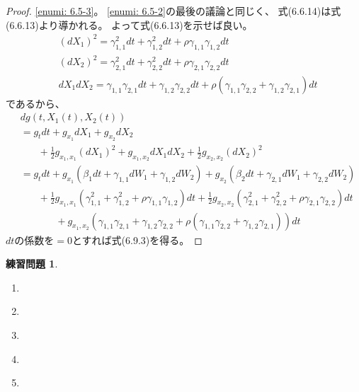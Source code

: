 \documentclass[uplatex]{jsarticle}
\theoremstyle{definition}
\newtheorem{prob}[prob]{練習問題}
\begin{document}
\begin{proof}
  \ref{enumi: 6.5-3}。
  \ref{enumi: 6.5-2}の最後の議論と同じく、
  式(6.6.14)は式(6.6.13)より導かれる。
  よって式(6.6.13)を示せば良い。
  \begin{align*}
    &(dX_1)^2
    = \gamma_{1,1}^2dt + \gamma_{1,2}^2dt
    + \rho \gamma_{1,1}\gamma_{1,2}dt \\
    &(dX_2)^2
    = \gamma_{2,1}^2dt + \gamma_{2,2}^2dt
    + \rho \gamma_{2,1}\gamma_{2,2}dt \\
    &dX_1dX_2
    = \gamma_{1,1}\gamma_{2,1}dt + \gamma_{1,2}\gamma_{2,2}dt
    + \rho (\gamma_{1,1}\gamma_{2,2} + \gamma_{1,2}\gamma_{2,1}) dt
  \end{align*}
  であるから、
  \begin{align*}
    &dg(t,X_1(t),X_2(t)) \\
    &= g_tdt
    + g_{x_1}dX_1 + g_{x_2}dX_2 \\
    &\ \ \ \ \ \ \ \
    + \frac{1}{2}g_{x_1,x_1}(dX_1)^2
    + g_{x_1,x_2}dX_1dX_2
    + \frac{1}{2}g_{x_2,x_2}(dX_2)^2 \\
    &= g_tdt
    + g_{x_1}\left( \beta_1dt + \gamma_{1,1}dW_1 + \gamma_{1,2}dW_2\right)
    + g_{x_2}\left( \beta_2dt + \gamma_{2,1}dW_1 + \gamma_{2,2}dW_2\right) \\
    &\ \ \ \ \ \ \ \
    + \frac{1}{2}g_{x_1,x_1}
    \left( \gamma_{1,1}^2
    + \gamma_{1,2}^2
    + \rho \gamma_{1,1}\gamma_{1,2}\right)dt
    + \frac{1}{2}g_{x_2,x_2}\left( \gamma_{2,1}^2
    + \gamma_{2,2}^2
    + \rho \gamma_{2,1}\gamma_{2,2}\right) dt \\
    &\ \ \ \ \ \ \ \ \ \ \ \ \ \ \ \
    + g_{x_1,x_2}\left( \gamma_{1,1}\gamma_{2,1}
    + \gamma_{1,2}\gamma_{2,2}
    + \rho (\gamma_{1,1}\gamma_{2,2} + \gamma_{1,2}\gamma_{2,1}) \right) dt
  \end{align*}
  \(dt\)の係数を\(=0\)とすれば式(6.9.3)を得る。
\end{proof}











\begin{prob}\label{prob: 6.6}
  \begin{enumerate}
    \item \label{enumi: 6.6-1}
    \item \label{enumi: 6.6-2}
    \item \label{enumi: 6.6-3}
    \item \label{enumi: 6.6-4}
    \item \label{enumi: 6.6-5}
  \end{enumerate}
\end{prob}
\end{document}
